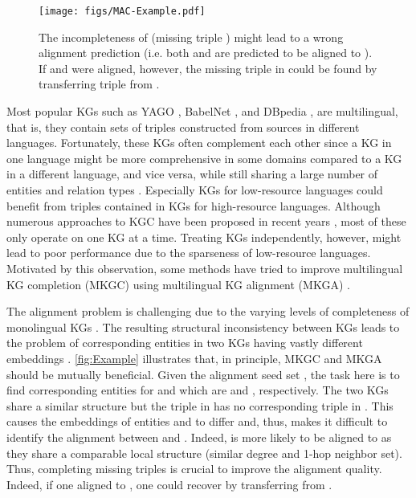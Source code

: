 \documentclass[11pt]{article}
\begin{document}
\begin{figure*}[!t]
	\centering
	\texttt{[image: figs/MAC-Example.pdf]}
    \caption{The incompleteness of  (missing triple ) might lead to a wrong alignment prediction (i.e. both  and  are predicted to be aligned to ). If  and  were aligned, however, the missing triple  in  could be found by transferring triple  from .}
    \label{fig:Example}
\end{figure*}




Most popular KGs such as YAGO \cite{Suchanek:2007}, BabelNet \cite{navigli-ponzetto-2010-babelnet}, and DBpedia \cite{LehmannIJJKMHMK15}, are multilingual, that is, they contain sets of triples constructed from sources in different languages. Fortunately, these KGs often complement each other since a KG in one language might be more comprehensive in some domains compared to a KG in a different language, and vice versa, while still sharing a large number of entities and relation types \cite{sun2020dual}. Especially KGs for low-resource languages could benefit from triples contained in KGs for high-resource languages. Although numerous approaches to KGC have been proposed in recent years \cite{bordes2013translating, dettmers2018convolutional, vashishth2019composition}, most of these only operate on one KG at a time. Treating KGs independently, however, might lead to poor performance due to the sparseness of low-resource languages. Motivated by this observation, some methods have tried to improve multilingual KG completion (MKGC) using multilingual KG alignment (MKGA) \cite{chen2020multilingual, singh2021multilingual, huang2022multilingual}.


The alignment problem is challenging due to the varying levels of completeness of monolingual KGs \cite{sun2020benchmarking}. The resulting structural inconsistency between KGs leads to the problem of corresponding entities in two KGs having vastly different embeddings \citep{jumping_knowledge}. 
\autoref{fig:Example} illustrates that, in principle, MKGC and MKGA should be mutually beneficial. Given the alignment seed set , the task here is to find corresponding entities for  and  which are  and , respectively. The two KGs share a similar structure but the triple  in   has no corresponding triple in . This causes the embeddings of entities  and  to differ and, thus, makes it difficult to identify the alignment between  and . Indeed,  is more likely to be aligned to  as they share a comparable local structure (similar degree and 1-hop neighbor set). Thus, completing missing triples is crucial to improve the alignment quality. Indeed, if one aligned  to , one could recover  by transferring   from .
\end{document}
